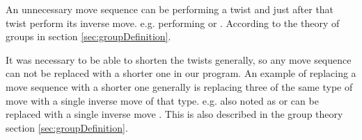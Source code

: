 An unnecessary move sequence can be performing a twist and just after that twist perform its inverse move. e.g. performing  or .
According to the theory of groups in section \ref{sec:groupDefinition}.

It was necessary to be able to shorten the twists generally, so any move sequence can not be replaced with a shorter one in our program.
An example of replacing a move sequence with a shorter one generally is replacing three of the same type of move with a single inverse move of that type. e.g.  also noted as  or  can be replaced with a single inverse move . This is also described in the group theory section \ref{sec:groupDefinition}.



